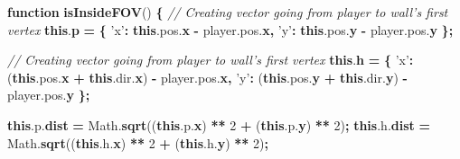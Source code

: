 \documentclass[11pt,french,a4paper,]{article}
\newenvironment{Shaded}{\begin{snugshade}}{\end{snugshade}}
\newcommand{\AttributeTok}[1]{\textcolor[rgb]{0.00,0.36,0.77}{\textbf{#1}}}
\newcommand{\CommentTok}[1]{\textcolor[rgb]{0.35,0.35,0.35}{\textit{#1}}}
\newcommand{\DecValTok}[1]{\textcolor[rgb]{0.00,0.00,0.81}{#1}}
\newcommand{\KeywordTok}[1]{\textcolor[rgb]{0.68,0.35,0.62}{\textbf{#1}}}
\newcommand{\NormalTok}[1]{#1}
\newcommand{\OperatorTok}[1]{\textcolor[rgb]{0.81,0.36,0.00}{\textbf{#1}}}
\newcommand{\StringTok}[1]{\textcolor[rgb]{0.31,0.60,0.02}{#1}}
\newcommand{\VariableTok}[1]{\textcolor[rgb]{0.90,0.33,0.00}{#1}}
\begin{document}
\begin{Shaded}
\begin{Highlighting}[]
\KeywordTok{function} \AttributeTok{isInsideFOV}\NormalTok{() }\OperatorTok{\{}
\CommentTok{// Creating vector going from player to wall's first vertex}
    \KeywordTok{this}\NormalTok{.}\AttributeTok{p} \OperatorTok{=} \OperatorTok{\{}
        \StringTok{'x'}\OperatorTok{:} \KeywordTok{this}\NormalTok{.}\VariableTok{pos}\NormalTok{.}\AttributeTok{x} \OperatorTok{-} \VariableTok{player}\NormalTok{.}\VariableTok{pos}\NormalTok{.}\AttributeTok{x}\OperatorTok{,}
        \StringTok{'y'}\OperatorTok{:} \KeywordTok{this}\NormalTok{.}\VariableTok{pos}\NormalTok{.}\AttributeTok{y} \OperatorTok{-} \VariableTok{player}\NormalTok{.}\VariableTok{pos}\NormalTok{.}\AttributeTok{y}
    \OperatorTok{\};}

\CommentTok{// Creating vector going from player to wall's first vertex}
    \KeywordTok{this}\NormalTok{.}\AttributeTok{h} \OperatorTok{=} \OperatorTok{\{}
        \StringTok{'x'}\OperatorTok{:}\NormalTok{ (}\KeywordTok{this}\NormalTok{.}\VariableTok{pos}\NormalTok{.}\AttributeTok{x} \OperatorTok{+} \KeywordTok{this}\NormalTok{.}\VariableTok{dir}\NormalTok{.}\AttributeTok{x}\NormalTok{) }\OperatorTok{-} \VariableTok{player}\NormalTok{.}\VariableTok{pos}\NormalTok{.}\AttributeTok{x}\OperatorTok{,}
        \StringTok{'y'}\OperatorTok{:}\NormalTok{ (}\KeywordTok{this}\NormalTok{.}\VariableTok{pos}\NormalTok{.}\AttributeTok{y} \OperatorTok{+} \KeywordTok{this}\NormalTok{.}\VariableTok{dir}\NormalTok{.}\AttributeTok{y}\NormalTok{) }\OperatorTok{-} \VariableTok{player}\NormalTok{.}\VariableTok{pos}\NormalTok{.}\AttributeTok{y}
    \OperatorTok{\};}

    \KeywordTok{this}\NormalTok{.}\VariableTok{p}\NormalTok{.}\AttributeTok{dist} \OperatorTok{=} \VariableTok{Math}\NormalTok{.}\AttributeTok{sqrt}\NormalTok{((}\KeywordTok{this}\NormalTok{.}\VariableTok{p}\NormalTok{.}\AttributeTok{x}\NormalTok{) }\OperatorTok{**} \DecValTok{2} \OperatorTok{+}\NormalTok{ (}\KeywordTok{this}\NormalTok{.}\VariableTok{p}\NormalTok{.}\AttributeTok{y}\NormalTok{) }\OperatorTok{**} \DecValTok{2}\NormalTok{)}\OperatorTok{;}
    \KeywordTok{this}\NormalTok{.}\VariableTok{h}\NormalTok{.}\AttributeTok{dist} \OperatorTok{=} \VariableTok{Math}\NormalTok{.}\AttributeTok{sqrt}\NormalTok{((}\KeywordTok{this}\NormalTok{.}\VariableTok{h}\NormalTok{.}\AttributeTok{x}\NormalTok{) }\OperatorTok{**} \DecValTok{2} \OperatorTok{+}\NormalTok{ (}\KeywordTok{this}\NormalTok{.}\VariableTok{h}\NormalTok{.}\AttributeTok{y}\NormalTok{) }\OperatorTok{**} \DecValTok{2}\NormalTok{)}\OperatorTok{;}


\end{Highlighting}
\end{Shaded}
\end{document}
